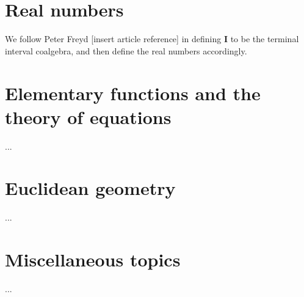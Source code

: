 \documentclass[one]{article}
\begin{document}
\section{Real numbers}

We follow Peter Freyd [insert article reference] in defining $\mathbf{I}$ to be the terminal interval coalgebra, and then define the real numbers accordingly. 

\section{Elementary functions and the theory of equations}

...

\section{Euclidean geometry}

...

\section{Miscellaneous topics}

...
\end{document}
